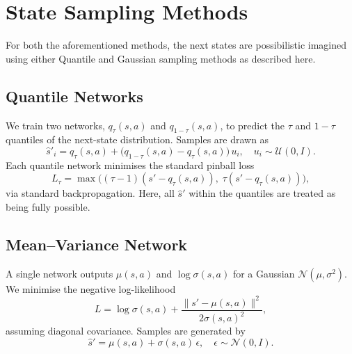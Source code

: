 \documentclass[11pt,a4paper]{report}
\begin{document}
%
%
%
%
%
%
%
\section{State Sampling Methods}

For both the aforementioned methods, the next states are possibilistic imagined using either Quantile and Gaussian sampling methods as described here. 

\subsection{Quantile Networks}
We train two networks, \(q_\tau(s,a)\) and \(q_{1-\tau}(s,a)\), to predict the \(\tau\) and \(1-\tau\) quantiles of the next-state distribution. Samples are drawn as
\[
  \hat{s}'_i = q_\tau(s,a) + \bigl(q_{1-\tau}(s,a) - q_\tau(s,a)\bigr)\,u_i,\quad
  u_i \sim \mathcal U(0,I).
\]
Each quantile network minimises the standard pinball loss
\[
  L_\tau = \max\bigl((\tau-1)(s' - q_\tau(s,a)),\;\tau(s' - q_\tau(s,a))\bigr),
\]
via standard backpropagation. Here, all $\hat{s}'$ within the quantiles are treated as being fully possible. 


\subsection{Mean–Variance Network}
A single network outputs \(\mu(s,a)\) and \(\log\sigma(s,a)\) for a Gaussian \(\mathcal N(\mu,\sigma^2)\). We minimise the negative log-likelihood
\[
  L = \log\sigma(s,a) + \frac{\|s' - \mu(s,a)\|^2}{2\sigma(s,a)^2},
\]
assuming diagonal covariance. Samples are generated by
\[ \hat{s}' = \mu(s,a) + \sigma(s,a)\,\epsilon,\quad \epsilon \sim \mathcal N(0,I). \]
\end{document}
